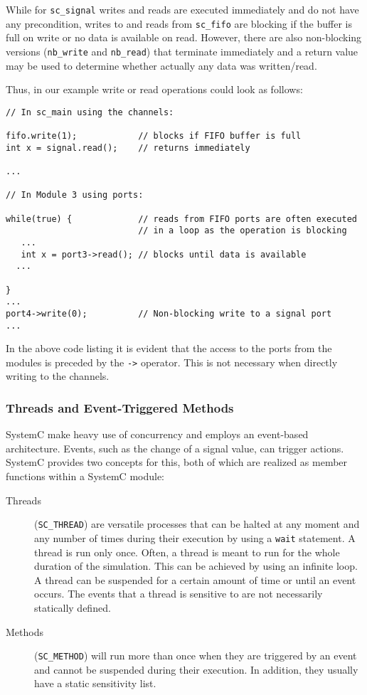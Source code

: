 \documentclass{template/openetcs_article}
\begin{document}
While for \verb|sc_signal| writes and reads are executed immediately and do not have any precondition, writes to and reads from \verb|sc_fifo| are blocking if the buffer is full on write or no data is available on read. However, there are also non-blocking versions (\verb|nb_write| and \verb|nb_read|) that terminate immediately and a return value may be used to determine whether actually any data was written/read.

Thus, in our example write or read operations could look as follows:
{\small
\begin{lstlisting}
// In sc_main using the channels:

fifo.write(1);            // blocks if FIFO buffer is full
int x = signal.read();    // returns immediately

...

// In Module 3 using ports:

while(true) {             // reads from FIFO ports are often executed
                          // in a loop as the operation is blocking
   ...
   int x = port3->read(); // blocks until data is available
  ...

}
...
port4->write(0);          // Non-blocking write to a signal port
...
\end{lstlisting}
}

In the above code listing it is evident that the access to the ports from the modules is preceded by the \verb|->| operator. This is not necessary when directly writing to the channels.

\subsubsection{Threads and Event-Triggered Methods}

SystemC make heavy use of concurrency and employs an event-based architecture. Events, such as the change of a signal value, can trigger actions. SystemC provides two concepts for this, both of which are realized as member functions within a SystemC module:

\begin{description}
\item[Threads] (\verb|SC_THREAD|) are versatile processes that can be halted at any moment and any number of times during their execution by using a \verb|wait| statement. A thread is run only once. Often, a thread is meant to run for the whole duration of the simulation. This can be achieved by using an infinite loop. A thread can be suspended for a certain amount of time or until an event occurs. The events that a thread is sensitive to are not necessarily statically defined.
\item[Methods] (\verb|SC_METHOD|) will run more than once when they are triggered by an event and cannot be suspended during their execution. In addition, they usually have a static sensitivity list.
\end{description}
\end{document}
